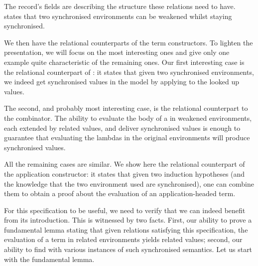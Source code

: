 

The record's fields are describing the structure these relations
need to have.  states that two synchronised environments
can be weakened whilst staying synchronised.


We then have the relational counterparts of the term constructors.
To lighten the presentation, we will focus on the most interesting
ones and give only one example quite characteristic of the remaining
ones. Our first interesting case is the relational counterpart of
: it states that given two synchronised environments, we
indeed get synchronised values in the model by applying 
to the looked up values.


The second, and probably most interesting case, is the relational counterpart
to the  combinator. The ability to evaluate the body of a  in
weakened environments, each extended by related values, and deliver synchronised
values is enough to guarantee that evaluating the lambdas in the original
environments will produce synchronised values.


All the remaining cases are similar. We show here the relational
counterpart of the application constructor: it states that given
two induction hypotheses (and the knowledge that the two environment
used are synchronised), one can combine them to obtain a proof
about the evaluation of an application-headed term.


For this specification to be useful, we need to verify that we can indeed
benefit from its introduction. This is witnessed by two facts. First, our
ability to prove a fundamental lemma stating that given relations satisfying
this specification, the evaluation of a term in related environments yields
related values; second, our ability to find with various instances of such
synchronised semantics. Let us start with the fundamental lemma.

